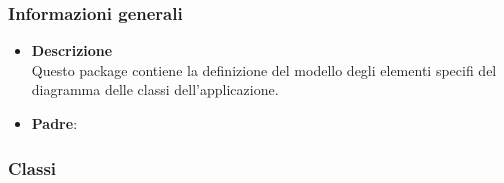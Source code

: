\subsubsection{Informazioni generali}
\begin{itemize}
\item \textbf{Descrizione}\\
Questo package contiene la definizione del modello degli elementi specifi del diagramma delle classi dell'applicazione.
\item \textbf{Padre}: \hyperref[\nogloxy{swedesigner::client::model::celltypes}]{}
\end{itemize}
\subsubsection{Classi}
\label{\nogloxy{swedesigner::client::model::celltypes::activity::ActivityDiagramElement}}
\begin{figure}[h]
\centering
{}
\caption{}
\end{figure}
\FloatBarrier

